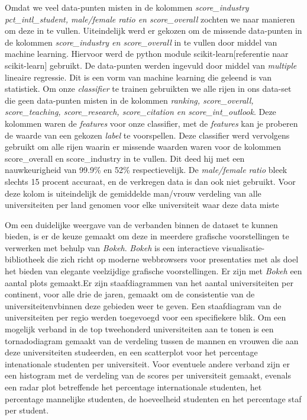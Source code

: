 \documentclass{uva-inf-article}
\begin{document}
Omdat we veel data-punten misten in de kolommen \textit{score\_industry} \textit{ pct\_intl\_student, male/female ratio en score\_overall} zochten we naar manieren om deze in te vullen. Uiteindelijk werd er gekozen om de missende data-punten in de kolommen \textit{score\_industry en score\_overall} in te vullen door middel van machine learning. Hiervoor werd de python module scikit-learn[referentie naar scikit-learn] gebruikt. De data-punten werden ingevuld door middel van \textit{multiple} lineaire regressie. Dit is een vorm van machine learning die geleend is van statistiek. Om onze \textit{classifier} te trainen gebruikten we alle rijen in ons data-set die geen data-punten misten in de kolommen \textit{ranking, score\_overall, score\_teaching, score\_research, score\_citation en score\_int\_outlook}. Deze kolommen waren de \textit{features} voor onze classifier, met de \textit{features} kan je proberen de waarde van een gekozen \textit{label} te voorspellen. Deze classifier werd vervolgens gebruikt om alle rijen waarin er missende waarden waren voor de kolommen score\_overall en score\_industry in te vullen. Dit deed hij met een nauwkeurigheid van 99.9\% en 52\% respectievelijk. De \textit{male/female ratio} bleek slechts 15 procent accuraat, en de verkregen data is dan ook niet gebruikt. Voor deze kolom is uiteindelijk de gemiddelde man/vrouw verdeling van alle universiteiten per land genomen voor elke universiteit waar deze data miste

Om een duidelijke weergave van de verbanden binnen de dataset te kunnen bieden, is er de keuze gemaakt om deze in meerdere grafische voorstellingen te verwerken met behulp van \textit{Bokeh}. \textit{Bokeh} is een interactieve visualisatie-bibliotheek die zich richt op moderne webbrowsers voor presentaties met als doel het bieden van elegante veelzijdige grafische voorstellingen.
Er zijn met \textit{Bokeh} een aantal plots gemaakt.Er zijn staafdiagrammen van het aantal universiteiten per continent, voor alle drie de jaren, gemaakt om de consistentie van de universiteitenvbinnen deze gebieden weer te geven. Een staafdiagram van de universiteiten per regio werden toegevoegd voor een specifiekere blik. Om een mogelijk verband in de top tweehonderd universiteiten aan te tonen is een tornadodiagram gemaakt van de verdeling tussen de mannen en vrouwen die aan deze universiteiten studeerden, en een scatterplot voor het percentage intenationale studenten per universiteit. Voor eventuele andere verband zijn er een histogram met de verdeling van de scores per universiteit gemaakt, evenals een radar plot betreffende het percentage internationale studenten, het percentage mannelijke studenten, de hoeveelheid studenten en het percentage staf per student. 
\end{document}
